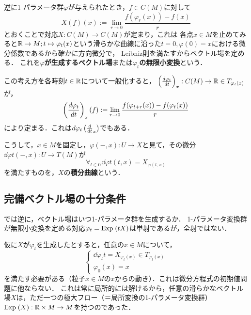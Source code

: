 \documentclass[uplatex,dvipdfmx]{jsreport}
\begin{document}
\begin{definition}
    逆に1-パラメータ群$\varphi$が与えられたとき，$f\in C(M)$に対して
    \[X(f)(x):=\lim_{r\to 0}\frac{f(\varphi_r(x))-f(x)}{r}\]
    とおくことで対応$X:C(M)\to C(M)$が定まり，これは
    各点$x\in M$を止めてみると$\mathbb{R}\to M;t\mapsto\varphi_t(x)$という滑らかな曲線に沿った$t=0,\varphi(0)=x$における微分係数であるから確かに方向微分で，
    Leibniz則を満たすからベクトル場を定める．
    これを\textbf{$\varphi$が生成するベクトル場}または\textbf{$\varphi_t$の無限小変換}という．
\end{definition}

\begin{definition}
    この考え方を各時刻$t\in\mathbb{R}$について一般化すると，
    $\left(\frac{d \varphi_t}{d t}\right)_x:C(M)\to\mathbb{R}\in T_{\varphi_t(x)}$が，
    \[\left(\frac{d \varphi_t}{d t}\right)_x(f):=\lim_{r\to 0}\frac{f(\varphi_{t+r}(x))-f(\varphi_t(x))}{r}\]
    により定まる．これは$d\varphi_t\left(\frac{d}{dt}_x\right)$でもある．

    こうして，$x\in M$を固定し，$\varphi(-,x):U\to X$と見て，その微分$\dd{\varphi}{t}(-,x):U\to T(M)$が
    \[\forall_{t\in U}\dd{\varphi}{t}(t,x)=X_{\varphi(t,x)}\]
    を満たすものを，$X$の\textbf{積分曲線}という．
\end{definition}

\subsection{完備ベクトル場の十分条件}

\begin{problem}
    では逆に，ベクトル場はいつ1-パラメータ群を生成するか．
    1-パラメータ変換群が無限小変換を定める対応$\varphi_t=\mathrm{Exp}\;(tX)$は単射であるが，全射ではない．
\end{problem}
\begin{discussion}
    仮に$X$が$\varphi_t$を生成したとすると，任意の$x\in M$について，
    \[\begin{cases}
        \dd{\varphi_t}{t}=X_{\varphi_t(x)}\in T_{\varphi_t(x)}\\
        \varphi_0(x)=x
    \end{cases}\]
    を満たす必要がある（粒子$x\in M$の$x$からの動き）．これは微分方程式の初期値問題に他ならない．
    これは常に局所的には解けるから，任意の滑らかなベクトル場$X$は，ただ一つの極大フロー（＝局所変換の1-パラメータ変換群）$\mathrm{Exp}\;(X):\mathbb{R}\times M\to M$を持つのであった．
\end{discussion}
\end{document}
